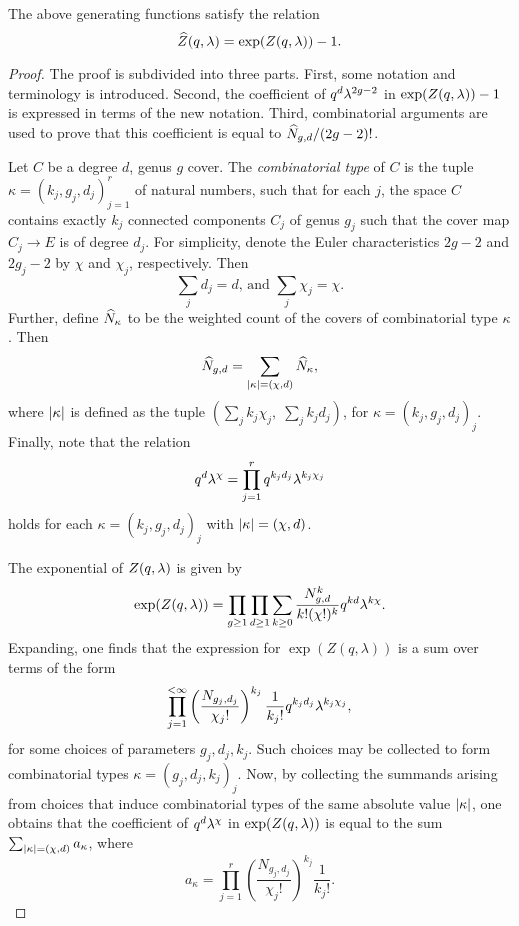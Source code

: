 \begin{lemma} \label{prop:connection-reduction}
 The above generating functions satisfy the relation \[\widehat{Z}(q,\lambda) = \exp(Z(q,\lambda)) - 1.\]
\end{lemma}
\begin{proof}
The proof is subdivided into three parts. First, some notation and terminology is introduced. Second, the coefficient of $q^{d}\lambda^{2g-2}$ in $\exp(Z(q,\lambda)) - 1$ is expressed in terms of the new notation. Third, combinatorial arguments are used to prove that this coefficient is equal to $\widehat{N}_{g,d}/(2g-2)!$.

 Let $C$ be a degree $d$, genus $g$ cover. The \emph{combinatorial type} of $C$ is the tuple $\kappa=(k_j,g_j,d_j)_{j=1}^r$ of natural numbers, such that for each $j$, the space $C$ contains exactly $k_j$ connected components $C_j$ of genus $g_j$ such that the cover map $C_j\to E$ is of degree $d_j$. For simplicity, denote the Euler characteristics $2g-2$ and $2g_j-2$ by $\chi$ and $\chi_j$, respectively. Then
 \[\sum_j d_j=d\text{, and }\sum_j \chi_j=\chi.\]
 Further, define $\widehat{N}_\kappa$ to be the weighted count of the covers of combinatorial type $\kappa$. Then
 \[
  \widehat{N}_{g,d}=\sum_{|\kappa|=(\chi,d)}\widehat{N}_\kappa,
 \]
 where $|\kappa|$ is defined as the tuple $(\sum_j k_j\chi_j,\;\sum_j k_jd_j)$, for $\kappa=(k_j,g_j,d_j)_j$.
 Finally, note that the relation
 \[
  q^d\lambda^\chi=\prod_{j=1}^r q^{k_jd_j}\lambda^{k_j\chi_j}
 \]
 holds for each $\kappa=(k_j,g_j,d_j)_j$ with $|\kappa|=(\chi,d)$.

 The exponential of $Z(q,\lambda)$ is given by 
 \[
  \exp(Z(q,\lambda))=\prod_{g\geq 1}\prod_{d\geq 1}\sum_{k\geq 0}\frac{N^k_{g,d}}{k!(\chi!)^k}q^{kd}\lambda^{k\chi}.
 \]
 Expanding, one finds that the expression for $\exp(Z(q,\lambda))$ is a sum over terms of the form
 \[
  \prod_{j=1}^{<\infty}\left(\frac{N_{g_j,d_j}}{\chi_j!}\right)^{k_j}\frac{1}{k_j!}q^{k_jd_j}\lambda^{k_j\chi_j},
 \]
 for some choices of parameters $g_j, d_j, k_j$. Such choices may be collected to form combinatorial types $\kappa=(g_j,d_j,k_j)_j$. Now, by collecting the summands arising from choices that induce combinatorial types of the same absolute value $|\kappa|$, one obtains that the coefficient of $q^d\lambda^\chi$ in $\exp(Z(q,\lambda))$ is equal to the sum $\sum_{|\kappa|=(\chi,d)}a_\kappa$, where 
 \[
  a_\kappa=\prod_{j=1}^{r}\left(\frac{N_{g_j,d_j}}{\chi_j!}\right)^{k_j}\frac{1}{k_j!}.
 \]


\end{proof}
